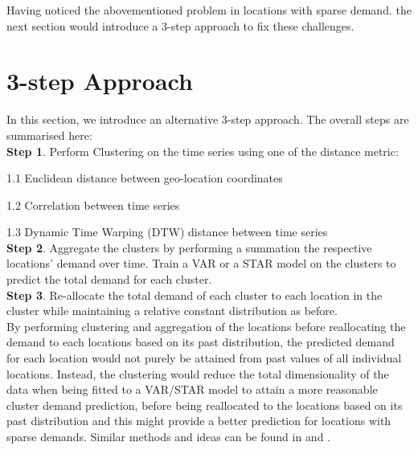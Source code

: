 \documentclass[nonblindrev,msom]{informs3} %
\begin{document}
\noindent Having noticed the abovementioned problem in locations with sparse demand. the next section would introduce a 3-step approach to fix these challenges. 

\section{3-step Approach}

In this section, we introduce an alternative 3-step approach. The overall steps are summarised here: \\

\noindent \textbf{Step 1}. Perform Clustering on the time series using one of the distance metric: 

	1.1 Euclidean distance between geo-location coordinates
	
	1.2 Correlation between time series 
	
	1.3 Dynamic Time Warping (DTW) distance between time series \\
	
	
	
\noindent \textbf{Step 2}. Aggregate the clusters by performing a summation the respective locations' demand over time. Train a VAR or a STAR model on the clusters to predict the total demand for each cluster. \\

\noindent \textbf{Step 3}. Re-allocate the total demand of each cluster to each location in the cluster while maintaining a relative constant distribution as before. \\







\noindent By performing clustering and aggregation of the locations before reallocating the demand to each locations based on its past distribution, the predicted demand for each location would not purely be attained from past values of all individual locations. Instead, the clustering would reduce the total dimensionality of the data when being fitted to a VAR/STAR model to attain a more reasonable cluster demand prediction, before being reallocated to the locations based on its past distribution and this might provide a better prediction for locations with sparse demands. Similar methods and ideas can be found in \cite{Paul2015} and \cite{Chi2014}.
\end{document}
